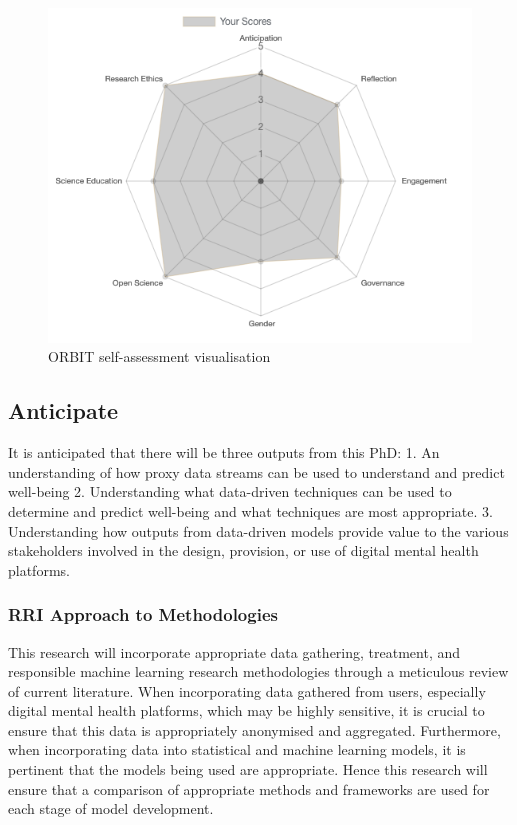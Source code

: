 \documentclass[12pt]{article}
\begin{document}
 
\begin{figure}[h]
    \centering
    \includegraphics[scale=1.2]{Images/RRI image.png}
    \caption{ORBIT self-assessment visualisation}
    \label{ORBIT RRI}
\end{figure}


\subsection{Anticipate}
It is anticipated that there will be three outputs from this PhD:
1.	An understanding of how proxy data streams can be used to understand and predict well-being
2.	Understanding what data-driven techniques can be used to determine and predict well-being and what techniques are most appropriate.
3.	Understanding how outputs from data-driven models provide value to the various stakeholders involved in the design, provision, or use of digital mental health platforms.

\subsubsection{RRI Approach to Methodologies}
This research will incorporate appropriate data gathering, treatment, and responsible machine learning research methodologies through a meticulous review of current literature. When incorporating data gathered from users, especially digital mental health platforms, which may be highly sensitive, it is crucial to ensure that this data is appropriately anonymised and aggregated. Furthermore, when incorporating data into statistical and machine learning models, it is pertinent that the models being used are appropriate. Hence this research will ensure that a comparison of appropriate methods and frameworks are used for each stage of model development.
\end{document}
